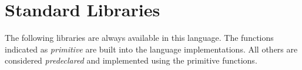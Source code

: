 \section{Standard Libraries}

The following libraries are always available in this language.
The functions indicated as \emph{primitive} are built into the
language implementations. All others are considered
\emph{predeclared} and implemented using the primitive functions.
